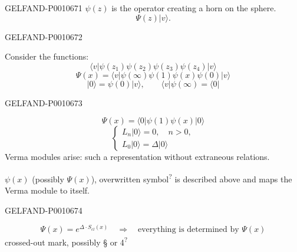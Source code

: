 \begin{GelfandAdjacentEvidence}{GELFAND-P001067}{1}
$\psi(z)$ is the operator creating a horn on the sphere.
\begin{equation*}
\Psi(z)|v\rangle.
\end{equation*}
\end{GelfandAdjacentEvidence}
\begin{GelfandAdjacentEvidence}{GELFAND-P001067}{2}

Consider the functions:
\begin{equation*}
\langle v|\psi(z_1)\psi(z_2)\psi(z_3)\psi(z_4)|v\rangle
\tag{23}
\end{equation*}
\begin{equation*}
\Psi(x)=\langle v|\psi(\infty)\psi(1)\psi(x)\psi(0)|v\rangle
\end{equation*}
\begin{equation*}
|0\rangle=\psi(0)|v\rangle,\qquad \langle v|\psi(\infty)=\langle0|
\end{equation*}
\end{GelfandAdjacentEvidence}
\begin{GelfandAdjacentEvidence}{GELFAND-P001067}{3}

\begin{equation*}
\Psi(x)=\langle0|\psi(1)\psi(x)|0\rangle
\end{equation*}
\begin{equation*}
\begin{cases}
L_n|0\rangle=0,\quad n>0,\\
L_0|0\rangle=\Delta|0\rangle
\end{cases}
\tag{24}
\end{equation*}
Verma modules arise: such a representation without extraneous relations.

$\psi(x)$ (possibly $\Psi(x)$), overwritten symbol\textsuperscript{?} is described above and maps the Verma module to itself.
\end{GelfandAdjacentEvidence}
\begin{GelfandAdjacentEvidence}{GELFAND-P001067}{4}

\begin{equation*}
\Psi(x)=e^{\Delta\cdot S_{cl}(x)}\quad\Rightarrow\quad\text{everything is determined by \(\Psi(x)\)}
\tag{25}
\end{equation*}
crossed-out mark, possibly § or 4\textsuperscript{?}\ 
\end{GelfandAdjacentEvidence}
